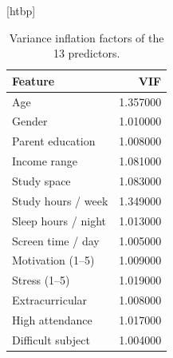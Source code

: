 \begin{table}
\small[htbp]
\caption{Variance inflation factors of the 13 predictors.}
\label{tab:S03_vif}
\begin{tabular}{lr}
\toprule
Feature & VIF \\
\midrule
Age & 1.357000 \\
Gender & 1.010000 \\
Parent education & 1.008000 \\
Income range & 1.081000 \\
Study space & 1.083000 \\
Study hours / week & 1.349000 \\
Sleep hours / night & 1.013000 \\
Screen time / day & 1.005000 \\
Motivation (1–5) & 1.009000 \\
Stress (1–5) & 1.019000 \\
Extracurricular & 1.008000 \\
High attendance & 1.017000 \\
Difficult subject & 1.004000 \\
\bottomrule
\end{tabular}
\end{table}
